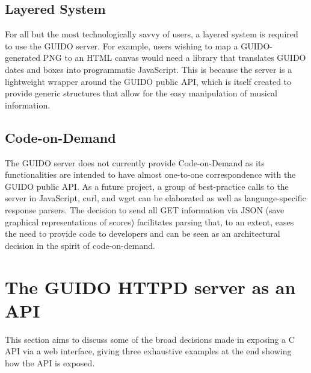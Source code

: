 \documentclass{article}
\begin{document}
\subsection{Layered System}
For all but the most technologically savvy of users, a layered system is required to use the GUIDO server.  For example, users wishing to map a GUIDO-generated PNG to an HTML canvas would need a library that translates GUIDO dates and boxes into programmatic JavaScript.  This is because the server is a lightweight wrapper around the GUIDO public API, which is itself created to provide  generic structures that allow for the easy manipulation of musical information.
\subsection{Code-on-Demand}
The GUIDO server does not currently provide Code-on-Demand as its functionalities are intended to have almost one-to-one correspondence with the GUIDO public API.  As a future project, a group of best-practice calls to the server in JavaScript, curl, and wget can be elaborated as well as language-specific response parsers.  The decision to send all GET information via JSON (save graphical representations of scores) facilitates parsing that, to an extent, eases the need to provide code to developers and can be seen as an architectural decision in the spirit of code-on-demand.
\section{The GUIDO HTTPD server as an API}\label{section:guido-api}
This section aims to discuss some of the broad decisions made in exposing a C API via a web interface, giving three exhaustive examples at the end showing how the API is exposed.
\end{document}

